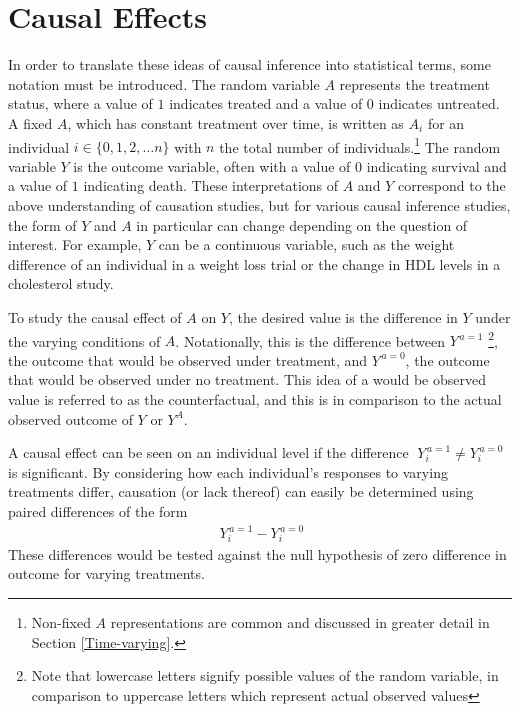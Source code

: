 \section{Causal Effects} 
In order to translate these ideas of causal inference into statistical terms, some notation must be introduced.  The random variable $A$ represents the treatment status, where a value of $1$ indicates treated and a value of $0$ indicates untreated.  A fixed $A$, which has constant treatment over time, is written as $A_i$ for an individual $i \in \{0,1,2,\dots n\}$ with $n$ the total number of individuals.\footnote{Non-fixed $A$ representations are common and discussed in greater detail in Section \ref{Time-varying}.} The random variable $Y$ is the outcome variable, often with a value of $0$ indicating survival and a value of $1$ indicating death.  These interpretations of $A$ and $Y$ correspond to the above understanding of causation studies, but for various causal inference studies, the form of $Y$ and $A$ in particular can change depending on the question of interest.  For example, $Y$ can be a continuous variable, such as the weight difference of an individual in a weight loss trial or the change in HDL levels in a cholesterol study. 

To study the causal effect of $A$ on $Y$, the desired value is the difference in $Y$ under the varying conditions of $A$.  Notationally, this is the difference between $Y^{\, a=1}$ \footnote{Note that lowercase letters signify possible values of the random variable, in comparison to uppercase letters which represent actual observed values}, the outcome that would be observed under treatment, and $Y^{\, a=0}$, the outcome that would be observed under no treatment.  This idea of a would be observed value is referred to as the counterfactual, and this is in comparison to the actual observed outcome of $Y$ or $Y^A$.  

A causal effect can be seen on an individual level if the difference $\; Y_i^{\, a=1} \neq Y_i^{\, a=0}$ is significant.  By considering how each individual's responses to varying treatments differ, causation (or lack thereof) can easily be determined using paired differences of the form 
\begin{align} \; Y_i^{\, a=1} - Y_i^{\, a=0}\end{align} 
These differences would be tested against the null hypothesis of zero difference in outcome for varying treatments.  

